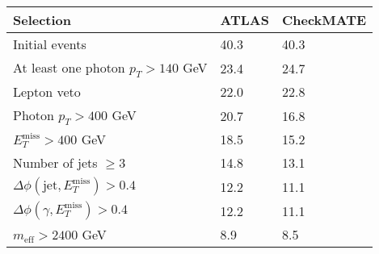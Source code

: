 \documentclass[12pt,fleqn]{article}
\begin{document}
\begin{enumerate}
\begin{table}[h!] 
 \renewcommand*{\arraystretch}{1.2}
 \begin{tabular}{l|p{3cm}|p{3cm}} \toprule
  Selection                                                                       & ATLAS    & CheckMATE       \\ \midrule
  Initial events                                                                  & 40.3     &  40.3          \\
  At least one photon $p_T>140$ GeV                                               & 23.4     &  24.7 \\
  Lepton veto                                                                     & 22.0     &  22.8 \\   
  Photon $p_T>400$ GeV                                                            & 20.7     &  16.8 \\
  $E_T^\mathrm{miss} > 400$ GeV                                                   & 18.5     &  15.2 \\
  Number of jets $\geq 3$                                                         & 14.8     &  13.1 \\
  $\Delta\phi(\mathrm{jet},E_T^\mathrm{miss}) > 0.4$                              & 12.2     &  11.1 \\  
  $\Delta\phi(\gamma,E_T^\mathrm{miss}) > 0.4$                                    & 12.2     &  11.1 \\
  $m_{\mathrm{eff}} > 2400$ GeV                                                   &  8.9     &   8.5 \\
 \bottomrule
 \end{tabular}
\end{table}  

\end{enumerate}
 
\end{document}
